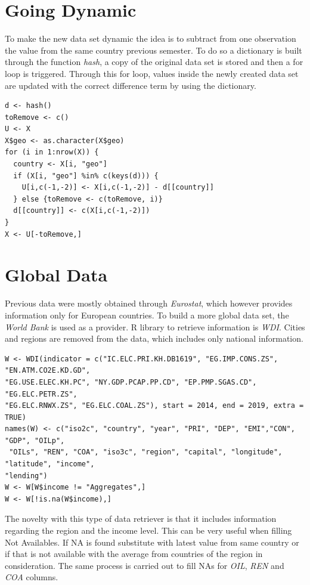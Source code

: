 \documentclass{book}
\begin{document}
\begin{appendices}
\section*{Going Dynamic}

To make the new data set dynamic the idea is to subtract from one observation the value from the same country previous semester. To do so a dictionary is built through the function \textit{hash}, a copy of the original data set is stored and then a for loop is triggered. Through this for loop, values inside the newly created data set are updated with the correct difference term by using the dictionary.

\begin{verbatim}
d <- hash()
toRemove <- c()
U <- X
X$geo <- as.character(X$geo)
for (i in 1:nrow(X)) {
  country <- X[i, "geo"]
  if (X[i, "geo"] %in% c(keys(d))) {
    U[i,c(-1,-2)] <- X[i,c(-1,-2)] - d[[country]]
  } else {toRemove <- c(toRemove, i)}
  d[[country]] <- c(X[i,c(-1,-2)])
}
X <- U[-toRemove,]
\end{verbatim}

\section*{Global Data}

Previous data were mostly obtained through \textit{Eurostat}, which however provides information only for European countries. To build a more global data set, the \textit{World Bank} is used as a provider. R library to retrieve information is \textit{WDI}. Cities and regions are removed from the data, which includes only national information.

\begin{verbatim}
W <- WDI(indicator = c("IC.ELC.PRI.KH.DB1619", "EG.IMP.CONS.ZS", "EN.ATM.CO2E.KD.GD",
"EG.USE.ELEC.KH.PC", "NY.GDP.PCAP.PP.CD", "EP.PMP.SGAS.CD", "EG.ELC.PETR.ZS",
"EG.ELC.RNWX.ZS", "EG.ELC.COAL.ZS"), start = 2014, end = 2019, extra = TRUE) 
names(W) <- c("iso2c", "country", "year", "PRI", "DEP", "EMI","CON", "GDP", "OILp",
 "OILs", "REN", "COA", "iso3c", "region", "capital", "longitude", "latitude", "income",
"lending")
W <- W[W$income != "Aggregates",]
W <- W[!is.na(W$income),]
\end{verbatim}

The novelty with this type of data retriever is that it includes information regarding the region and the income level. This can be very useful when filling Not Availables. If NA is found substitute with latest value from same country or if that is not available with the average from countries of the region in consideration. The same process is carried out to fill NAs for \textit{OIL}, \textit{REN} and \textit{COA} columns.


\end{appendices}
\end{document}
